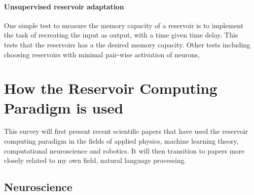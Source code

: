 \documentclass[12pt,oneside]{CUNY_CS_PhD}
\begin{document}
\subsubsection{Unsupervised reservoir adaptation}
One simple test to measure the memory capacity of a reservoir is to implement the task of recreating the input as output, with a time given time delay. This tests that the reservoirs has a  the desired memory capacity. Other tests including choosing reservoirs with minimal pair-wise activation of neurons, %


\chapter{How the Reservoir Computing Paradigm is used}
\label{lit}
This survey will first present recent scientific papers that have used the reservoir computing paradigm in the fields of applied physics, machine learning theory, computational neuroscience and robotics.%
 It will then transition to papers more closely related to my own field, natural language processing.

\section{Neuroscience}
\end{document}
